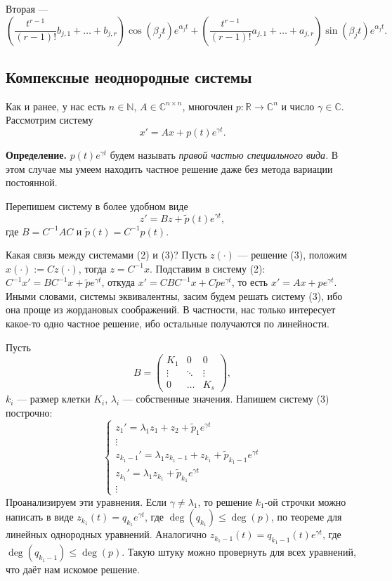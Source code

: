 Вторая ---
\[
    \left( \frac{t^{r-1}}{(r-1)!} b_{j,1} + \dots + b_{j,r} \right) \cos(\beta_j t) e^{\alpha_j t} + \left( \frac{t^{r-1}}{(r-1)!} a_{j,1} + \dots + a_{j,r} \right) \sin(\beta_j t) e^{\alpha_j t}.
\]

\subsection{Компексные неоднородные системы}
Как и ранее, у нас есть $n \in \mathbb N$, $A \in \mathbb C^{n \times n}$, многочлен $p: \mathbb R \to \mathbb C^n$ и число $\gamma \in \mathbb C$.
Рассмотрим систему
\begin{equation}
    x' = Ax + p(t) e^{\gamma t}.
\end{equation}

\textbf{Определение.} $p(t) e^{\gamma t}$ будем называть \textit{правой частью специального вида}.
В этом случае мы умеем находить частное решение даже без метода вариации постоянной.

Перепишем систему в более удобном виде
\begin{equation}
    z' = Bz + \tilde p(t) e^{\gamma t},
\end{equation}
где $B = C^{-1} A C$ и $\tilde p(t) = C^{-1} p(t)$.

Какая связь между системами (2) и (3)?
Пусть $z(\cdot)$ --- решение (3), положим $x(\cdot) := C z(\cdot)$, тогда $z = C^{-1} x$.
Подставим в систему (2): $C^{-1} x' = BC^{-1} x + \tilde p e^{\gamma t}$, откуда $x' = CBC^{-1} x + C \tilde p e^{\gamma t}$, то есть $x' = Ax + p e^{\gamma t}$.
Иными словами, системы эквивалентны, засим будем решать систему (3), ибо она проще из жордановых соображений.
В частности, нас только интересует какое-то одно частное решение, ибо остальные получаются по линейности.

Пусть
\[
    B =
    \begin{pmatrix}
        K_1 & 0 & 0 \\
        \vdots & \ddots & \vdots \\
        0 & \dots & K_s
    \end{pmatrix},
\]
$k_i$ --- размер клетки $K_i$, $\lambda_i$ --- собственные значения.
Напишем систему (3) построчно:
\[
    \begin{cases}
        z_1' = \lambda_1 z_1 + z_2 + \tilde p_1 e^{\gamma t} \\
        \vdots \\
        z_{k_1-1}' = \lambda_1 z_{k_1 - 1} + z_{k_1} + \tilde p_{k_1 - 1} e^{\gamma t} \\
        z_{k_1}' = \lambda_1 z_{k_1} + \tilde p_{k_1} e^{\gamma t} \\
        \vdots
    \end{cases}
\]
Проанализируем эти уравнения.
Если $\gamma \ne \lambda_1$, то решение $k_1$-ой строчки можно написать в виде $z_{k_1}(t) = q_{k_1} e^{\gamma t}$, где $\deg(q_{k_1}) \le \deg(p)$, по теореме для линейных однородных уравнений.
Аналогично $z_{k_1 - 1}(t) = q_{k_1-1}(t) e^{\gamma t}$, где $\deg(q_{k_1-1}) \le \deg(p)$.
Такую штуку можно провернуть для всех уравнений, что даёт нам искомое решение.

